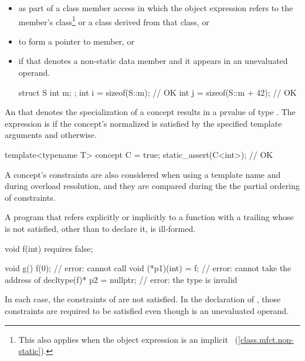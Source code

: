 \begin{itemize}
\item as part of a class member access in which the
object expression
refers to the member's class\footnote{This also applies when the object expression
is an implicit ~(\ref{class.mfct.non-static}).} or a class derived from
that class, or

\item to form a pointer to member, or

\item if that  denotes a non-static data member
and it appears in an unevaluated operand.
\begin{example}

\begin{codeblock}
struct S {
  int m;
};
int i = sizeof(S::m);           // OK
int j = sizeof(S::m + 42);      // OK
\end{codeblock}
\end{example}
\end{itemize}

\pnum
An 
that denotes the specialization of a concept
results in a prvalue of type .
The expression is  if
the concept's normalized
is satisfied
by the specified template arguments
and  otherwise.
\begin{example}
\begin{codeblock}
template<typename T> concept C = true;
static_assert(C<int>);  // OK
\end{codeblock}
\end{example}
\begin{note}
A concept's constraints are also considered
when using a template name
and during overload resolution,
and they are compared
during the the partial ordering of constraints.
\end{note}

\pnum
A program that refers
explicitly or implicitly
to a function with a trailing 
whose  is not satisfied,
other than to declare it,
is ill-formed.
\begin{example}
\begin{codeblock}
void f(int) requires false;

void g() {
  f(0);                         // error: cannot call 
  void (*p1)(int) = f;          // error: cannot take the address of 
  decltype(f)* p2 = nullptr;    // error: the type  is invalid
}
\end{codeblock}
In each case, the constraints of  are not satisfied.
In the declaration of ,
those constraints are required to be satisfied
even though
 is an unevaluated operand.
\end{example}

